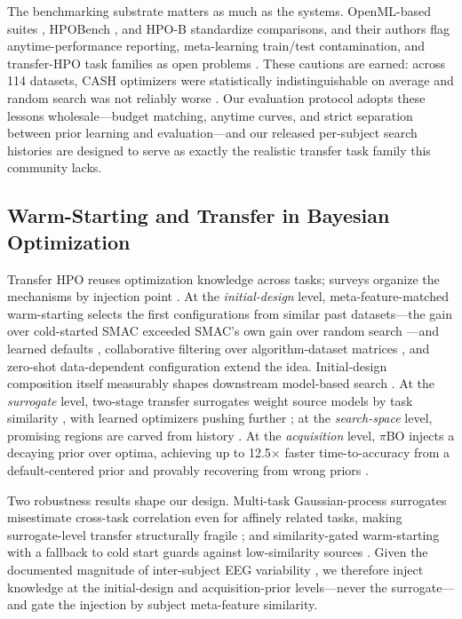 The benchmarking substrate matters as much as the systems. OpenML-based suites \cite{GijsbersEtAl2019, GijsbersEtAl2021}, HPOBench \cite{EggenspergerEtAl2021}, and HPO-B \cite{ArangoEtAl2021} standardize comparisons, and their authors flag anytime-performance reporting, meta-learning train/test contamination, and transfer-HPO task families as open problems \cite{GijsbersEtAl2019, EggenspergerEtAl2021}. These cautions are earned: across 114 datasets, CASH optimizers were statistically indistinguishable on average and random search was not reliably worse \cite{ZollerHuber2019}. Our evaluation protocol adopts these lessons wholesale---budget matching, anytime curves, and strict separation between prior learning and evaluation---and our released per-subject search histories are designed to serve as exactly the realistic transfer task family this community lacks.

\subsection{Warm-Starting and Transfer in Bayesian Optimization}
\label{sec:related:transfer}

Transfer HPO reuses optimization knowledge across tasks; surveys organize the mechanisms by injection point \cite{BaiEtAl2023, Vanschoren2019}. At the \emph{initial-design} level, meta-feature-matched warm-starting selects the first configurations from similar past datasets---the gain over cold-started SMAC exceeded SMAC's own gain over random search \cite{FeurerEtAl2015}---and learned defaults \cite{PfistererEtAl2018}, collaborative filtering over algorithm-dataset matrices \cite{YangEtAl2018}, and zero-shot data-dependent configuration \cite{GijsbersEtAl2021, HollmannEtAl2025} extend the idea. Initial-design composition itself measurably shapes downstream model-based search \cite{BossekEtAl2020}. At the \emph{surrogate} level, two-stage transfer surrogates weight source models by task similarity \cite{WistubaGrabocka2021, LiEtAl2022c}, with learned optimizers pushing further \cite{ChenEtAl2022}; at the \emph{search-space} level, promising regions are carved from history \cite{LiEtAl2022d, PerroneEtAl2019}. At the \emph{acquisition} level, $\pi$BO injects a decaying prior over optima, achieving up to 12.5$\times$ faster time-to-accuracy from a default-centered prior and provably recovering from wrong priors \cite{HvarfnerEtAl2022}.

Two robustness results shape our design. Multi-task Gaussian-process surrogates misestimate cross-task correlation even for affinely related tasks, making surrogate-level transfer structurally fragile \cite{HvarfnerEtAl2026}; and similarity-gated warm-starting with a fallback to cold start guards against low-similarity sources \cite{NomuraEtAl2021}. Given the documented magnitude of inter-subject EEG variability \cite{ZhangEtAl2024}, we therefore inject knowledge at the initial-design and acquisition-prior levels---never the surrogate---and gate the injection by subject meta-feature similarity.

